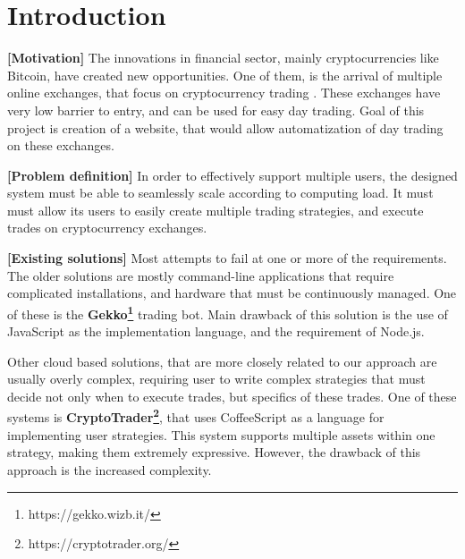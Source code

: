 \documentclass{ExcelAtFIT}
\affiliation{*%
\href{mailto:xhorni14@fit.vutbr.cz}{xhorni14@fit.vutbr.cz},
\textit{Faculty of Information Technology, Brno University of Technology}}
\begin{document}
    \startdocument



    \section{Introduction}

    \textbf{[Motivation]}
    The innovations in financial sector, mainly cryptocurrencies like Bitcoin, have created new opportunities. One of them,
    is the arrival of multiple online exchanges, that focus on cryptocurrency trading . These exchanges have very low
    barrier to entry, and can be used for easy day trading. Goal of this project is creation of a website, that would allow
    automatization of day trading on these exchanges.

    \textbf{[Problem definition]} In order to effectively support multiple users, the designed system must be able to seamlessly
    scale according to computing load. It must must allow its users to easily create multiple trading strategies, and execute
    trades on cryptocurrency exchanges.

    \textbf{[Existing solutions]} Most attempts to fail at one or more of the requirements. The older solutions
    are mostly command-line applications that require complicated installations, and hardware that must be continuously managed.
    One of these is the \textbf{Gekko\footnote{https://gekko.wizb.it/}} trading bot. Main drawback of this solution is
    the use of JavaScript as the implementation language, and the requirement of Node.js.

    Other cloud based solutions, that are more closely related to our approach are usually overly complex, requiring user to write
    complex strategies that must decide not only when to execute trades, but specifics of these trades.
    One of these systems is \textbf{CryptoTrader\footnote{https://cryptotrader.org/}}, that uses CoffeeScript as a language for implementing
    user strategies. This system supports multiple assets within one strategy, making them extremely expressive. However,
    the drawback of this approach is the increased complexity.
\end{document}
